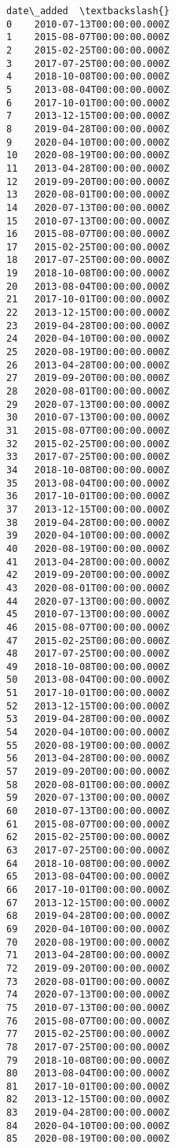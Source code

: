 \documentclass[11pt]{article}
\begin{document}
\begin{tcolorbox}[breakable, size=fbox, boxrule=.5pt, pad at break*=1mm, opacityfill=0]
\begin{Verbatim}[commandchars=\\\{\}]
                   date\_added  \textbackslash{}
0    2010-07-13T00:00:00.000Z
1    2015-08-07T00:00:00.000Z
2    2015-02-25T00:00:00.000Z
3    2017-07-25T00:00:00.000Z
4    2018-10-08T00:00:00.000Z
5    2013-08-04T00:00:00.000Z
6    2017-10-01T00:00:00.000Z
7    2013-12-15T00:00:00.000Z
8    2019-04-28T00:00:00.000Z
9    2020-04-10T00:00:00.000Z
10   2020-08-19T00:00:00.000Z
11   2013-04-28T00:00:00.000Z
12   2019-09-20T00:00:00.000Z
13   2020-08-01T00:00:00.000Z
14   2020-07-13T00:00:00.000Z
15   2010-07-13T00:00:00.000Z
16   2015-08-07T00:00:00.000Z
17   2015-02-25T00:00:00.000Z
18   2017-07-25T00:00:00.000Z
19   2018-10-08T00:00:00.000Z
20   2013-08-04T00:00:00.000Z
21   2017-10-01T00:00:00.000Z
22   2013-12-15T00:00:00.000Z
23   2019-04-28T00:00:00.000Z
24   2020-04-10T00:00:00.000Z
25   2020-08-19T00:00:00.000Z
26   2013-04-28T00:00:00.000Z
27   2019-09-20T00:00:00.000Z
28   2020-08-01T00:00:00.000Z
29   2020-07-13T00:00:00.000Z
30   2010-07-13T00:00:00.000Z
31   2015-08-07T00:00:00.000Z
32   2015-02-25T00:00:00.000Z
33   2017-07-25T00:00:00.000Z
34   2018-10-08T00:00:00.000Z
35   2013-08-04T00:00:00.000Z
36   2017-10-01T00:00:00.000Z
37   2013-12-15T00:00:00.000Z
38   2019-04-28T00:00:00.000Z
39   2020-04-10T00:00:00.000Z
40   2020-08-19T00:00:00.000Z
41   2013-04-28T00:00:00.000Z
42   2019-09-20T00:00:00.000Z
43   2020-08-01T00:00:00.000Z
44   2020-07-13T00:00:00.000Z
45   2010-07-13T00:00:00.000Z
46   2015-08-07T00:00:00.000Z
47   2015-02-25T00:00:00.000Z
48   2017-07-25T00:00:00.000Z
49   2018-10-08T00:00:00.000Z
50   2013-08-04T00:00:00.000Z
51   2017-10-01T00:00:00.000Z
52   2013-12-15T00:00:00.000Z
53   2019-04-28T00:00:00.000Z
54   2020-04-10T00:00:00.000Z
55   2020-08-19T00:00:00.000Z
56   2013-04-28T00:00:00.000Z
57   2019-09-20T00:00:00.000Z
58   2020-08-01T00:00:00.000Z
59   2020-07-13T00:00:00.000Z
60   2010-07-13T00:00:00.000Z
61   2015-08-07T00:00:00.000Z
62   2015-02-25T00:00:00.000Z
63   2017-07-25T00:00:00.000Z
64   2018-10-08T00:00:00.000Z
65   2013-08-04T00:00:00.000Z
66   2017-10-01T00:00:00.000Z
67   2013-12-15T00:00:00.000Z
68   2019-04-28T00:00:00.000Z
69   2020-04-10T00:00:00.000Z
70   2020-08-19T00:00:00.000Z
71   2013-04-28T00:00:00.000Z
72   2019-09-20T00:00:00.000Z
73   2020-08-01T00:00:00.000Z
74   2020-07-13T00:00:00.000Z
75   2010-07-13T00:00:00.000Z
76   2015-08-07T00:00:00.000Z
77   2015-02-25T00:00:00.000Z
78   2017-07-25T00:00:00.000Z
79   2018-10-08T00:00:00.000Z
80   2013-08-04T00:00:00.000Z
81   2017-10-01T00:00:00.000Z
82   2013-12-15T00:00:00.000Z
83   2019-04-28T00:00:00.000Z
84   2020-04-10T00:00:00.000Z
85   2020-08-19T00:00:00.000Z

\end{Verbatim}
\end{tcolorbox}
\end{document}
